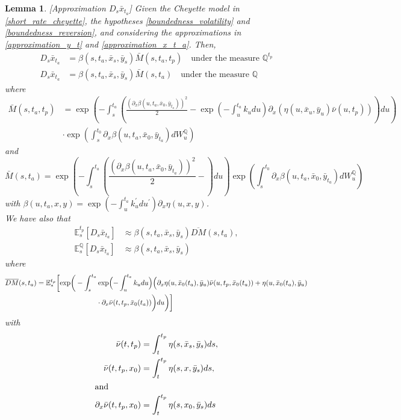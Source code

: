 \documentclass[a4paper,10pt]{article}
\newtheorem{lemma}[theorem]{Lemma}
\newcommand{\1}{\mathbf{1}}
\begin{document}
\begin{lemma}\label{DsX}[Approximation $D_s \bar{x}_{t_a}$]
Given the Cheyette model in \eqref{short_rate_cheyette}, the hypotheses \ref{boundedness_volatility} and \ref{boundedness_reversion}, and considering the approximations in \eqref{approximation_y_t} and \eqref{approximation_x_t_a}. Then, 
\begin{align}\label{approximation_D_s_x_t}
D_s \bar{x}_{t_a} &= \beta(s,t_a,\bar{x}_s,\bar{y}_s) \bar{M}(s,t_a,t_p) \quad \text{under the measure $\mathbb{Q}^{t_p}$} \nonumber \\
D_s \bar{x}_{t_a} &= \beta(s,t_a,\bar{x}_s,\bar{y}_s) \bar{M}(s,t_a)  \quad \text{under the measure $\mathbb{Q}$}
\end{align}
where
\begin{align*}
\bar{M}(s,t_a,t_p) &= \exp\left(-\int_{s}^{t_a} \left( \frac{\left(\partial_x \beta(u,t_a,\bar{x}_0,\bar{y}_{t_a})\right)^{2}}{2} - \exp\left(-\int_{u}^{t_a}k_u du\right) \partial_x (\eta(u, \bar{x}_u, \bar{y}_{u}) \bar{\nu}(u,t_p))\right) du \right) \\ 
&\cdot\exp\left(\int_{s}^{t_0} \partial_x \beta(u,t_a,\bar{x}_0,\bar{y}_{t_a}) dW^{\mathbb{Q}}_u \right)
\end{align*}
and
\begin{equation*}
\bar{M}(s,t_a) = \exp\left(-\int_{s}^{t_a} \left( \frac{\left(\partial_x \beta(u,t_a,\bar{x}_0,\bar{y}_{t_a})\right)^{2}}{2} - \right) du \right) \exp\left(\int_{s}^{t_0} \partial_x \beta(u,t_a,\bar{x}_0,\bar{y}_{t_a}) dW^{\mathbb{Q}}_u \right)
\end{equation*} 
with $\beta(u,t_a,x,y) = \exp\left(-\int_{u}^{t_a}k_u^{\prime} du^{\prime}\right) \partial_x \eta(u,x,y)$.\\

We have also that
\begin{align}\label{approsimation_E_s_x_t}
\mathbb{E}_s^{t_p}\left[D_s \bar{x}_{t_a}\right] &\approx \beta(s,t_a,\bar{x}_s,\bar{y}_s) \overline{DM}(s,t_a), \nonumber \\
\mathbb{E}_s^{\mathbb{Q}}\left[D_s \bar{x}_{t_a}\right]&\approx \beta(s,t_a,\bar{x}_s,\bar{y}_s)
\end{align}
where 
\begin{align*}
\overline{DM}(s,t_a) &= \mathbb{E}^{t_p}_s\biggl[\exp\biggr(-\int_{s}^{t_a} \exp\Bigl(-\int_{u}^{t_a}k_u du\Bigr) \Bigl(\partial_x \eta(u, \bar{x}_0(t_a), \bar{y}_{u}) \bar{\nu}(u,t_p, \bar{x}_0(t_a)) + \eta(u,\bar{x}_0(t_a), \bar{y}_{u}) \\
\qquad &\hspace{3cm} \cdot \partial_x \bar{\nu} (t,t_p, \bar{x}_0(t_a))\biggr) du\biggr)\biggr]
\end{align*}
with  
\begin{align*}
\bar{\nu}(t,t_p) &= \int_{t}^{t_p} \eta(s,\bar{x}_s,\bar{y}_s) ds, \\
\bar{\nu}(t,t_p, x_0) &= \int_{t}^{t_p} \eta(s,x,\bar{y}_s) ds,\\
\intertext{and}
\partial_x \bar{\nu}(t,t_p,x_0) &= \int_{t}^{t_p} \eta(s,x_0,\bar{y}_s) ds
\end{align*}
\end{lemma}
\end{document}

